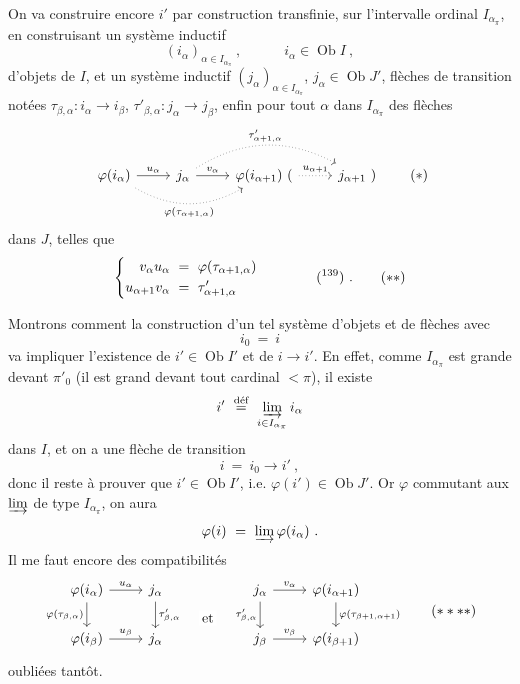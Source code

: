 \documentclass[11pt]{article}
\newcommand{\printedpage}[1]{\marginpar{\footnotesize p.~#1}}
\newcommand{\msp}[1]{\marginpar{\footnotesize [#1]}}
\newcommand{\Ob}{\operatorname{Ob}}
\begin{document}
On va construire encore $i'$ par construction transfinie, sur l'intervalle ordinal $I_{\alpha_\pi}$, en construisant un système inductif
\[
(i_\alpha)_{\alpha\in I_{\alpha_\pi}} \ , \qquad\quad i_\alpha \in \Ob I \ ,
\]
d'objets de $I$, et un système inductif $(j_\alpha)_{\alpha\in I_{\alpha_\pi}}$, $j_\alpha \in \Ob J'$, flèches de transition notées $\tau_{\beta,\alpha} : i_\alpha \longrightarrow i_\beta$, $\tau'_{\beta,\alpha} : j_\alpha \longrightarrow j_\beta$, enfin pour tout $\alpha$ dans $I_{\alpha_\pi}$ des flèches
\[
\begin{tikzcd}
\varphi(i_\alpha) \arrow[r, "u_\alpha"] \arrow[rr, dotted, bend right, "\varphi(\tau_{\alpha+1,\alpha})"'] & j_\alpha \arrow[r, "v_\alpha"] \arrow[rr, dotted, bend left, "\tau'_{\alpha+1,\alpha}"] & \varphi(i_{\alpha+1})\ ( \arrow[r, dotted, "u_{\alpha+1}"] & j_{\alpha+1}\ )
\end{tikzcd}
\tag*{$(*)$}
\]
\printedpage{118}
dans $J$, telles que
\[
\left\{
\begin{aligned}
v_\alpha u_\alpha \ &= \ \varphi(\tau_{\alpha+1,\alpha}) \\
u_{\alpha+1} v_\alpha \ &= \ \tau'_{\alpha+1,\alpha}
\end{aligned}
\right.
\qquad\qquad \text{(\footnotemark[139])} \ .
\tag*{$(**)$}
\]

\msp{page 314}\noindent Montrons comment la construction d'un tel système d'objets et de flèches avec
\[
i_0 \ = \ i \tag*{$(***)$}
\]
va impliquer l'existence de $i' \in \Ob I'$ et de $i \longrightarrow i'$. En effet, comme $I_{\alpha_\pi}$ est grande devant $\pi'_0$ (il est grand devant tout cardinal $< \pi$), il existe
\[
i' \ \overset{\text{déf}}{=} \ \varinjlim_{i\in I_{\alpha_\pi}} i_\alpha %
\]
dans $I$, et on a une flèche de transition
\[
i \ = \ i_0 \longrightarrow i' \ ,
\]
donc il reste à prouver que $i' \in \Ob I'$, i.e. $\varphi(i') \in \Ob J'$. Or $\varphi$ commutant aux $\varinjlim$ de type $I_{\alpha_\pi}$, on aura
\[
\varphi(i) \ = \ \varinjlim \varphi(i_\alpha) \ .
\]
Il me faut encore des compatibilités
\[
\begin{tikzcd}
\varphi(i_\alpha) \arrow[r, "u_\alpha"] \arrow[d, "\varphi(\tau_{\beta,\alpha})"'] & j_\alpha \arrow[d, "\tau'_{\beta,\alpha}"] & {} \arrow[d, phantom, "\text{et}" description] & j_\alpha \arrow[r, "v_\alpha"] \arrow[d, "\tau'_{\beta,\alpha}"'] & \varphi(i_{\alpha+1}) \arrow[d, "\varphi(\tau_{\beta+1,\alpha+1})"] \\
\varphi(i_\beta) \arrow[r, "u_\beta"] & j_\alpha & {} & j_\beta \arrow[r, "v_\beta"] & \varphi(i_{\beta+1})
\end{tikzcd}
\tag*{$(****)$} %
\]
oubliées tantôt.
\end{document}
